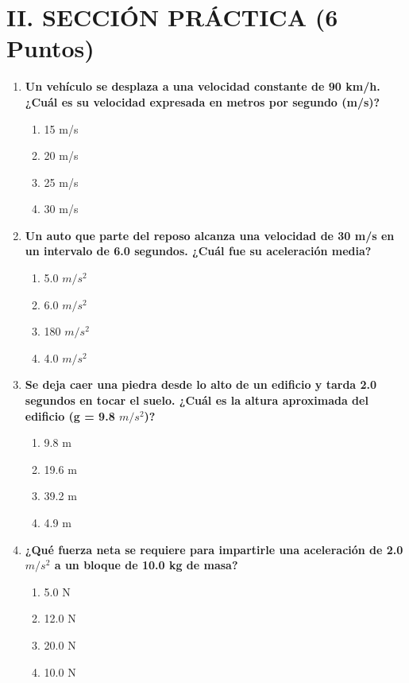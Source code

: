 \documentclass[12pt]{article}
\begin{document}
\section*{II. SECCIÓN PRÁCTICA (6 Puntos)}

\begin{enumerate}[label=\arabic*.]
    \item \textbf{Un vehículo se desplaza a una velocidad constante de 90 km/h. ¿Cuál es su velocidad expresada en metros por segundo (m/s)?}
    \begin{enumerate}[label=\alph*)]
        \item 15 m/s
        \item 20 m/s
        \item 25 m/s
        \item 30 m/s
    \end{enumerate}

    \item \textbf{Un auto que parte del reposo alcanza una velocidad de 30 m/s en un intervalo de 6.0 segundos. ¿Cuál fue su aceleración media?}
    \begin{enumerate}[label=\alph*)]
        \item 5.0 $m/s^2$
        \item 6.0 $m/s^2$
        \item 180 $m/s^2$
        \item 4.0 $m/s^2$
    \end{enumerate}

    \item \textbf{Se deja caer una piedra desde lo alto de un edificio y tarda 2.0 segundos en tocar el suelo. ¿Cuál es la altura aproximada del edificio (g = 9.8 $m/s^2$)?}
    \begin{enumerate}[label=\alph*)]
        \item 9.8 m
        \item 19.6 m
        \item 39.2 m
        \item 4.9 m
    \end{enumerate}

    \item \textbf{¿Qué fuerza neta se requiere para impartirle una aceleración de 2.0 $m/s^2$ a un bloque de 10.0 kg de masa?}
    \begin{enumerate}[label=\alph*)]
        \item 5.0 N
        \item 12.0 N
        \item 20.0 N
        \item 10.0 N
    \end{enumerate}
\end{enumerate}
\end{document}
